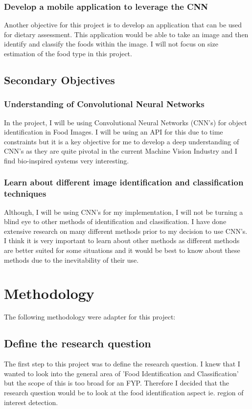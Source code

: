 \subsubsection*{Develop a mobile application to leverage the CNN}
Another objective for this project is to develop an application that can be used
for dietary assessment. This application would be able to take an image and then
identify and classify the foods within the image. I will not focus on size
estimation of the food type in this project.

\subsection*{Secondary Objectives}
\subsubsection*{Understanding of Convolutional Neural Networks}
In the project, I will be using Convolutional Neural Networks (CNN's) for object identification in Food Images.
I will be using an API for this due to time constraints but it is a key
objective for me to develop a deep understanding of CNN's as they are quite pivotal in the current Machine Vision Industry and I find bio-inspired systems very interesting.

\subsubsection*{Learn about different image identification and classification techniques}
Although, I will be using CNN's for my implementation, I will not be turning a
blind eye to other methods of identification and classification.
I have done extensive research on many different methods prior to my decision to use CNN's.
I think it is very important to learn about other methods as different methods
are better suited for some situations and it would be best to know about these methods due to the inevitability of their use.

\section{Methodology}
The following methodology were adapter for this project:

\subsection*{Define the research question}
The first step to this project was to define the research question.
I knew that I wanted to look into the general area of 'Food Identification and
Classification' but the scope of this is too broad for an FYP.
Therefore I decided that the research question would be to look at the food identification aspect ie. region of interest detection.

